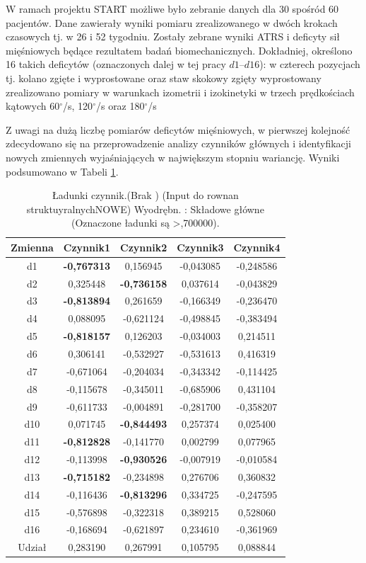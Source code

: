 W ramach projektu START możliwe było zebranie danych dla 30 spośród 60 pacjentów. Dane zawierały wyniki pomiaru zrealizowanego w dwóch krokach czasowych tj. w 26 i 52 tygodniu. Zostały zebrane wyniki ATRS i deficyty sił mięśniowych będące rezultatem badań biomechanicznych. Dokładniej, określono 16 takich deficytów (oznaczonych dalej w tej pracy $d1$--$d16$): w czterech pozycjach tj. kolano zgięte i wyprostowane oraz staw skokowy zgięty wyprostowany zrealizowano pomiary w warunkach izometrii i izokinetyki w trzech prędkościach kątowych 60$^\circ$/s, 120$^\circ$/s oraz 180$^\circ$/s  

Z uwagi na dużą liczbę pomiarów deficytów mięśniowych, w pierwszej kolejność zdecydowano się na przeprowadzenie analizy czynników głównych i identyfikacji nowych zmiennych wyjaśniających w największym stopniu wariancję. Wyniki podsumowano w Tabeli \ref{tab:pca-muscles}.

\begin{table}[t!]
	\scriptsize
	\centering
	\setlength{\tabcolsep}{3pt}
	\setlength\extrarowheight{2pt}
	\caption{Ładunki czynnik.(Brak ) (Input do rownan struktuyralnychNOWE) Wyodrębn. : Składowe główne (Oznaczone ładunki są >,700000).}
	\label{tab:pca-muscles}
	\begin{tabular}{c|c|c|c|c}

		Zmienna&Czynnik1&Czynnik2&Czynnik3&Czynnik4 \\
		\hline
		d1&\textbf{-0,767313}&0,156945&-0,043085&-0,248586 \\
		\hline
		d2&0,325448&\textbf{-0,736158}&0,037614&-0,043829 \\
		\hline
		d3&\textbf{-0,813894}&0,261659&-0,166349&-0,236470 \\
		\hline
		d4&0,088095&-0,621124&-0,498845&-0,383494 \\
		\hline
		d5&\textbf{-0,818157}&0,126203&-0,034003&0,214511 \\
		\hline
		d6&0,306141&-0,532927&-0,531613&0,416319 \\
		\hline
		d7&-0,671064&-0,204034&-0,343342&-0,114425 \\
		\hline
		d8&-0,115678&-0,345011&-0,685906&0,431104 \\
		\hline
		d9&-0,611733&-0,004891&-0,281700&-0,358207 \\
		\hline
		d10&0,071745&\textbf{-0,844493}&0,257374&0,025400 \\
		\hline
		d11&\textbf{-0,812828}&-0,141770&0,002799&0,077965 \\
		\hline
		d12&-0,113998&\textbf{-0,930526}&-0,007919&-0,010584 \\
		\hline
		d13&\textbf{-0,715182}&-0,234898&0,276706&0,360832 \\
		\hline
		d14&-0,116436&\textbf{-0,813296}&0,334725&-0,247595 \\
		\hline
		d15&-0,576898&-0,322318&0,389215&0,528060 \\
		\hline
		d16&-0,168694&-0,621897&0,234610&-0,361969 \\
		\hline\hline
		Udział&0,283190&0,267991&0,105795&0,088844 \\

	\end{tabular}
\end{table}



